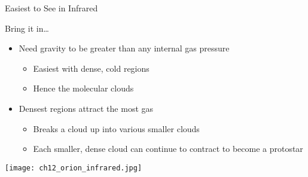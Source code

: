 \documentclass[pdf, aspectratio=169]{beamer}
\begin{document}
\begin{frame}{Easiest to See in Infrared}
  \begin{center}
  \end{center}
\end{frame}

\begin{frame}{Bring it in\ldots}
  \begin{itemize}
	\item Need gravity to be greater than any internal gas pressure
	  \begin{itemize}
		\item Easiest with dense, cold regions
		\item Hence the molecular clouds
	  \end{itemize}
	\item Densest regions attract the most gas
	  \begin{itemize}
		\item Breaks a cloud up into various smaller clouds
		\item Each smaller, dense cloud can continue to contract to become a protostar
	  \end{itemize}
  \end{itemize}
  \begin{center}
	\texttt{[image: ch12\_orion\_infrared.jpg]}
  \end{center}
\end{frame}
\end{document}
